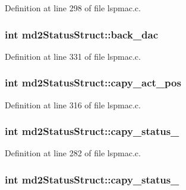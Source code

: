 Definition at line 298 of file lspmac.\-c.

\hypertarget{structmd2StatusStruct_a33ce490348c8de255cf49b96469d3d4e}{
\subsubsection[{back\-\_\-dac}]{\setlength{\rightskip}{0pt plus 5cm}int md2\-Status\-Struct\-::back\-\_\-dac}}\label{structmd2StatusStruct_a33ce490348c8de255cf49b96469d3d4e}


Definition at line 331 of file lspmac.\-c.

\hypertarget{structmd2StatusStruct_ae25122a6db146501b51609b9cb59b044}{
\subsubsection[{capy\-\_\-act\-\_\-pos}]{\setlength{\rightskip}{0pt plus 5cm}int md2\-Status\-Struct\-::capy\-\_\-act\-\_\-pos}}\label{structmd2StatusStruct_ae25122a6db146501b51609b9cb59b044}


Definition at line 316 of file lspmac.\-c.

\hypertarget{structmd2StatusStruct_a7f4e945e80b1980b9e69366a69ad79cc}{
\subsubsection[{capy\-\_\-status\-\_\-1}]{\setlength{\rightskip}{0pt plus 5cm}int md2\-Status\-Struct\-::capy\-\_\-status\-\_}}\label{structmd2StatusStruct_a7f4e945e80b1980b9e69366a69ad79cc}


Definition at line 282 of file lspmac.\-c.

\hypertarget{structmd2StatusStruct_a5d7c10d9a16ebcc53ac4a0770ab2ef62}{
\subsubsection[{capy\-\_\-status\-\_\-2}]{\setlength{\rightskip}{0pt plus 5cm}int md2\-Status\-Struct\-::capy\-\_\-status\-\_}}\label{structmd2StatusStruct_a5d7c10d9a16ebcc53ac4a0770ab2ef62}


